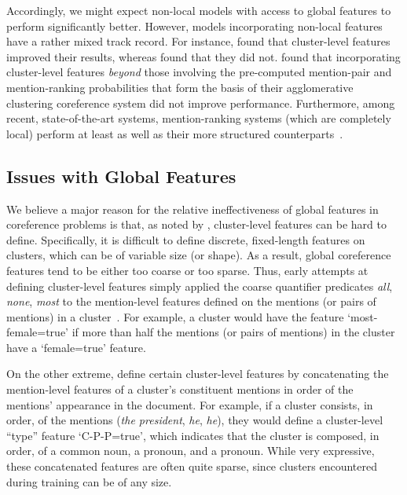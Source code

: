 \documentclass[11pt,letterpaper]{article}
\begin{document}
Accordingly, we might expect non-local models with access to global features to perform significantly better. However, models incorporating non-local features have a rather mixed track record. For instance,  found that cluster-level features improved their results, whereas  found that they did not.  found that incorporating cluster-level features \textit{beyond} those involving the pre-computed mention-pair and mention-ranking probabilities that form the basis of their agglomerative clustering coreference system did not improve performance. Furthermore, among recent, state-of-the-art systems, mention-ranking systems (which are completely local) perform at least as well as their more structured counterparts~\cite{DandK:14,clark15entity,wiseman15learning,peng15a}. 

\subsection{Issues with Global Features}
We believe a major reason for the relative ineffectiveness of global features in coreference problems is that, as noted by , cluster-level features can be hard to define.  Specifically, it is difficult to define discrete, fixed-length features on clusters, which can be of variable size (or shape). As a result, global coreference features tend to be either too coarse or too sparse. Thus, early attempts at defining cluster-level features simply applied the coarse quantifier predicates \textit{all}, \textit{none}, \textit{most} to the mention-level features defined on the mentions (or pairs of mentions) in a cluster~\cite{culotta2007first,rahman11narrowing}. For example, a cluster would have the feature `most-female=true' if more than half the mentions (or pairs of mentions) in the cluster have a `female=true' feature. 

On the other extreme,  define certain cluster-level features by concatenating the mention-level features of a cluster's constituent mentions in order of the mentions' appearance in the document. For example, if a cluster consists, in order, of the mentions (\textit{the president}, \textit{he}, \textit{he}), they would define a cluster-level ``type'' feature `C-P-P=true', which indicates that the cluster is composed, in order, of a common noun, a pronoun, and a pronoun. While very expressive, these concatenated features are often quite sparse, since clusters encountered during training can be of any size. 
 
\end{document}

